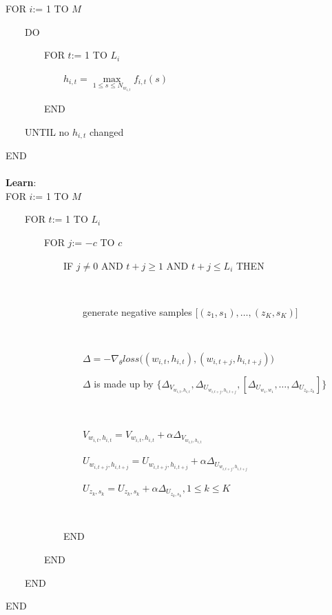 FOR $i$:= 1 TO $M$

\ \ \ \ DO

\ \ \ \ \ \ \ \ FOR $t$:= 1 TO $L_i$

\ \ \ \ \ \ \ \ \ \ \ \ $h_{i,t} = \max\limits_{1\leq s\leq N_{w_{i,t}}} f_{i,t}(s)$

\ \ \ \ \ \ \ \ END

\ \ \ \ UNTIL no $h_{i,t}$ changed

END

\paragraph{} \textbf{Learn}:\\

FOR $i$:= 1 TO $M$

\ \ \ \ FOR $t$:= 1 TO $L_i$

\ \ \ \ \ \ \ \ FOR $j$:= $-c$ TO $c$

\ \ \ \ \ \ \ \ \ \ \ \ IF $j\neq 0$ AND $t+j\geq1$ AND $t+j\leq L_i$ THEN

\ \ \ \ \ \ \ \ \ \ \ \ \ \ \ \

\ \ \ \ \ \ \ \ \ \ \ \ \ \ \ \ generate negative samples $\big [(z_1,s_1),\ldots,(z_K,s_K)\big ]$

\ \ \ \ \ \ \ \ \ \ \ \ \ \ \ \

\ \ \ \ \ \ \ \ \ \ \ \ \ \ \ \ $\Delta = -\nabla_\theta loss\big ( (w_{i,t},h_{i,t}),(w_{i,t+j},h_{i,t+j})\big )$

\ \ \ \ \ \ \ \ \ \ \ \ \ \ \ \ $\Delta$ is made up by $ \{\Delta_{V_{w_{i,t},h_{i,t}}}, \Delta_{U_{w_{i,t+j},h_{i,t+j}}}, [\Delta_{U_{w_1,w_1}},\ldots,\Delta_{U_{z_k,z_k}}]\}$

\ \ \ \ \ \ \ \ \ \ \ \ \ \ \ \

\ \ \ \ \ \ \ \ \ \ \ \ \ \ \ \ $V_{w_{i,t},h_{i,t}} = V_{w_{i,t},h_{i,t}} + \alpha \Delta_{V_{w_{i,t},h_{i,t}}}$
 
\ \ \ \ \ \ \ \ \ \ \ \ \ \ \ \ $U_{w_{i,t+j},h_{i,t+j}} = U_{w_{i,t+j},h_{i,t+j}} + \alpha \Delta_{U_{w_{i,t+j},h_{i,t+j}}}$ 

\ \ \ \ \ \ \ \ \ \ \ \ \ \ \ \ $U_{z_k,s_k} = U_{z_k,s_k} + \alpha \Delta_{U_{z_k,s_k}}, 1\leq k\leq K$ 

\ \ \ \ \ \ \ \ \ \ \ \ \ \ \ \
 
\ \ \ \ \ \ \ \ \ \ \ \ END 

\ \ \ \ \ \ \ \  END

\ \ \ \ END

END\\

